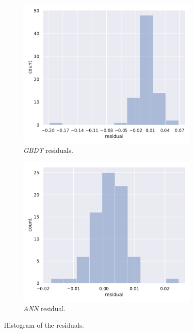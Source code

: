 \begin{figure}[htbp]
  \centering
  \begin{subfigure}{0.45\textwidth}
    \centering
    \includegraphics[width=\linewidth]{img/gbdt_lgbmregressor_test_histogram}
    \caption{\emph{GBDT} residuals.}
  \end{subfigure}
  \begin{subfigure}{0.45\textwidth}
    \centering
    \includegraphics[width=\linewidth]{img/ann_model_test_histogram}
    \caption{\emph{ANN} residual.}
  \end{subfigure}
  \caption{Histogram of the residuals.}
  \label{fig:lumps:hist}
\end{figure}

